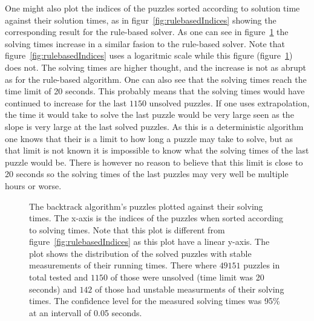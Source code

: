 \documentclass[a4paper,11pt]{kth-mag}
\begin{document}
\FloatBarrier
One might also plot the indices of the puzzles sorted according to solution time against their solution times, as in figur~\ref{fig:rulebasedIndices} showing the corresponding result for the rule-based solver.
As one can see in figure~\ref{fig:backtrackIndices} the solving times increase in a similar fasion to the rule-based solver.
Note that figure~\ref{fig:rulebasedIndices} uses a logaritmic scale while this figure (figure~\ref{fig:backtrackIndices}) does not.
The solving times are higher thought, and the increase is not as abrupt as for the rule-based algorithm.
One can also see that the solving times reach the time limit of 20 seconds.
This probably means that the solving times would have continued to increase for the last $1150$ unsolved puzzles.
If one uses extrapolation, the time it would take to solve the last puzzle would be very large seen as the slope is very large at the last solved puzzles. 
As this is a deterministic algorithm one knows that their is a limit to how long a puzzle may take to solve, but as that limit is not known it is impossible to know what the solving times of the last puzzle would be.
There is however no reason to believe that this limit is close to 20 seconds so the solving times of the last puzzles may very well be multiple hours or worse.
\\
\begin{figure}[here] 
\noindent{}
\vspace{-15pt}
\caption{The backtrack algorithm's puzzles plotted against their solving times. The x-axis is the indices of the puzzles when sorted according to solving times. Note that this plot is different from figure~\ref{fig:rulebasedIndices} as this plot have a linear y-axis. The plot shows the distribution of the solved puzzles with stable measurements of their running times. There where $49151$ puzzles in total tested and $1150$ of those were unsolved (time limit was 20 seconds) and $142$ of those had unstable measurments of their solving times. The confidence level for the measured solving times was 95\% at an intervall of 0.05 seconds.}
\label{fig:backtrackIndices}
\end{figure}
\end{document}
